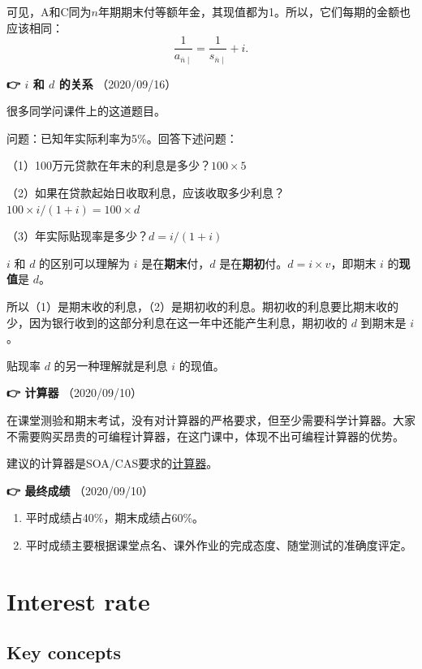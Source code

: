 \documentclass[
]{book}
\begin{document}
可见，A和C同为\(n\)年期期末付等额年金，其现值都为1。所以，它们每期的金额也应该相同：
\[\frac{1}{a_{\overline{n}\mid}}=\frac{1}{s_{\overline{n}\mid}}+i.\]

\textbf{👉 \(i\) 和 \(d\) 的关系} （2020/09/16）

很多同学问课件上的这道题目。

问题：已知年实际利率为5\%。回答下述问题：

（1）100万元贷款在年末的利息是多少？\(100\times5%
\)

（2）如果在贷款起始日收取利息，应该收取多少利息？\(100\times i/(1+i)=100\times d\)

（3）年实际贴现率是多少？\(d=i/(1+i)\)

\(i\) 和 \(d\) 的区别可以理解为 \(i\) 是在\textbf{期末}付，\(d\) 是在\textbf{期初}付。\(d=i\times v\)，即期末 \(i\) 的\textbf{现值}是 \(d\)。

所以（1）是期末收的利息，（2）是期初收的利息。期初收的利息要比期末收的少，因为银行收到的这部分利息在这一年中还能产生利息，期初收的 \(d\) 到期末是 \(i\)。

贴现率 \(d\) 的另一种理解就是利息 \(i\) 的现值。

\textbf{👉 计算器} （2020/09/10）

在课堂测验和期末考试，没有对计算器的严格要求，但至少需要科学计算器。大家不需要购买昂贵的可编程计算器，在这门课中，体现不出可编程计算器的优势。

建议的计算器是SOA/CAS要求的\href{https://www.soa.org/education/exam-req/exam-day-info/edu-id-calculators/}{计算器}。

\textbf{👉 最终成绩} （2020/09/10）

\begin{enumerate}
\def\labelenumi{\arabic{enumi}.}
\item
  平时成绩占40\%，期末成绩占60\%。
\item
  平时成绩主要根据课堂点名、课外作业的完成态度、随堂测试的准确度评定。
\end{enumerate}

\hypertarget{interest-rate}{%
\chapter{Interest rate}\label{interest-rate}}

\hypertarget{key-concepts}{%
\section{Key concepts}\label{key-concepts}}
\end{document}
